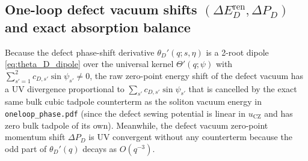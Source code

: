 \documentclass[11pt,a4paper]{article}
\begin{document}
\subsection{One-loop defect vacuum shifts $(\Delta E_D^{\mathrm{ren}}, \Delta P_D)$ and exact absorption balance}

Because the defect phase-shift derivative $\theta_D'(q;s,\eta)$ is a 2-root
dipole \eqref{eq:theta_D_dipole} over the universal kernel $\Theta'(q;\psi)$
with $\sum_{s'=1}^2 c_{D,s'}\sin\psi_{s'} \ne 0$, the raw zero-point energy shift
of the defect vacuum has a UV divergence proportional to $\sum_{s'} c_{D,s'}\sin\psi_{s'}$
that is cancelled by the exact same bulk cubic tadpole counterterm as the
soliton vacuum energy in \texttt{oneloop\_phase.pdf} (since the defect sewing
potential is linear in $u_{\mathrm{CZ}}$ and has zero bulk tadpole of its own).
Meanwhile, the defect vacuum zero-point momentum shift $\Delta P_D$ is UV
convergent without any counterterm because the odd part of $\theta_D'(q)$ decays
as $O(q^{-3})$.
\end{document}

